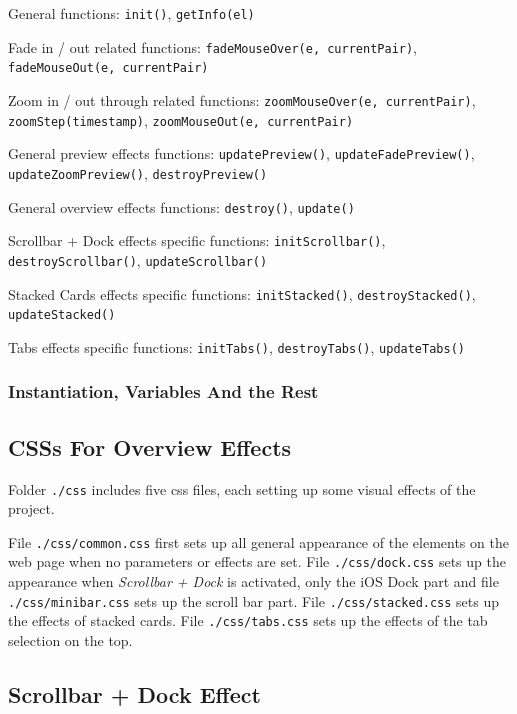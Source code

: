 General functions: \texttt{init()}, \texttt{getInfo(el)}

Fade in / out related functions: \texttt{fadeMouseOver(e, currentPair)}, \texttt{fadeMouseOut(e, currentPair)}

Zoom in / out through related functions: \texttt{zoomMouseOver(e, currentPair)}, \texttt{zoomStep(timestamp)}, \texttt{zoomMouseOut(e, currentPair)}

General preview effects functions: \texttt{updatePreview()}, \texttt{updateFadePreview()}, \texttt{updateZoomPreview()}, \texttt{destroyPreview()}

General overview effects functions: \texttt{destroy()}, \texttt{update()}

Scrollbar + Dock effects specific functions: \texttt{initScrollbar()}, \texttt{destroyScrollbar()}, \texttt{updateScrollbar()}

Stacked Cards effects specific functions: \texttt{initStacked()}, \texttt{destroyStacked()}, \texttt{updateStacked()}

Tabs effects specific functions: \texttt{initTabs()}, \texttt{destroyTabs()}, \texttt{updateTabs()}

\subsubsection{Instantiation, Variables And the Rest}

\subsection{CSSs For Overview Effects}
\label{chap4:frontend-css}

Folder \texttt{./css} includes five \gls{css} files, each setting up some visual effects of the project.

File \texttt{./css/common.css} first sets up all general appearance of the elements on the web page when no parameters or effects are set. File \texttt{./css/dock.css} sets up the appearance when \emph{Scrollbar + Dock} is activated, only the iOS Dock part and file \\\texttt{./css/minibar.css} sets up the scroll bar part. File \texttt{./css/stacked.css} sets up the effects of stacked cards. File \texttt{./css/tabs.css} sets up the effects of the tab selection on the top.

\subsection{Scrollbar + Dock Effect}

